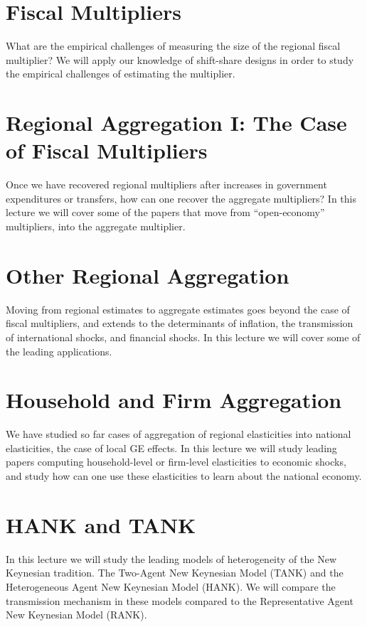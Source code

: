 \documentclass [12pt]{article}
\begin{document}
\section{Fiscal Multipliers}

What are the empirical challenges of measuring the size of the regional fiscal multiplier? We will apply our knowledge of shift-share designs in order to study the empirical challenges of estimating the multiplier. 

\section{Regional Aggregation I: The Case of Fiscal Multipliers}

Once we have recovered regional multipliers after increases in government expenditures or transfers, how can one recover the aggregate multipliers? In this lecture we will cover some of the papers that move from ``open-economy'' multipliers, into the aggregate multiplier.


\section{Other Regional Aggregation}

Moving from regional estimates to aggregate estimates goes beyond the case of fiscal multipliers, and extends to the determinants of inflation, the transmission of international shocks, and financial shocks. In this lecture we will cover some of the leading applications.


\section{Household and Firm Aggregation}


We have studied so far cases of aggregation of regional elasticities into national elasticities, the case of local GE effects. In this lecture we will study leading papers computing household-level or firm-level elasticities to economic shocks, and study how can one use these elasticities to learn about the national economy.


\section{HANK and TANK}

In this lecture we will study the leading models of heterogeneity of the New Keynesian tradition. The Two-Agent New Keynesian Model (TANK) and the Heterogeneous Agent New Keynesian Model (HANK). We will compare the transmission mechanism in these models compared to the Representative Agent New Keynesian Model (RANK).
\end{document}
